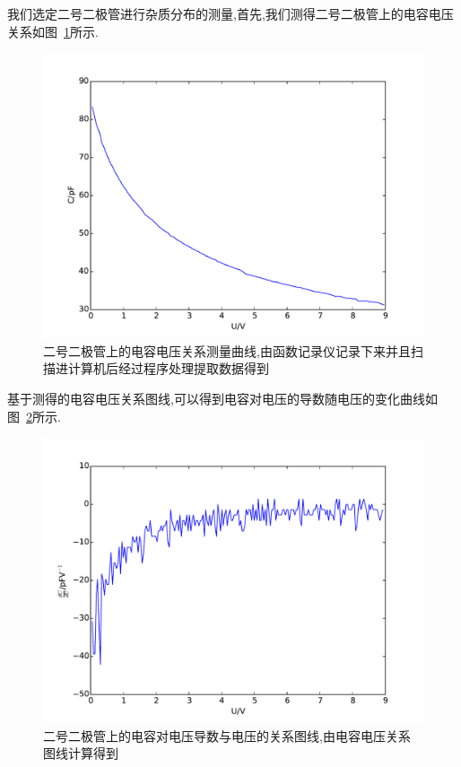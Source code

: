 \documentclass[aps,pre,12pt,preprint,onecolumn,showpacs,showkeys]{revtex4-1}
\begin{document}
我们选定二号二极管进行杂质分布的测量,首先,我们测得二号二极管上的电容电压关系如图~\ref{uc}所示.

\begin{figure}
\begin{center}
    \includegraphics[width=\textwidth]{uc.pdf}
\end{center}
\caption{\label{uc}二号二极管上的电容电压关系测量曲线,由函数记录仪记录下来并且扫
描进计算机后经过程序处理提取数据得到}
\end{figure}

基于测得的电容电压关系图线,可以得到电容对电压的导数随电压的变化曲线如图~\ref{diff}所示.

\begin{figure}
\begin{center}
    \includegraphics[width=\textwidth]{diff.pdf}
\end{center}
\caption{\label{diff}二号二极管上的电容对电压导数与电压的关系图线,由电容电压关系
图线计算得到}
\end{figure}
\end{document}
